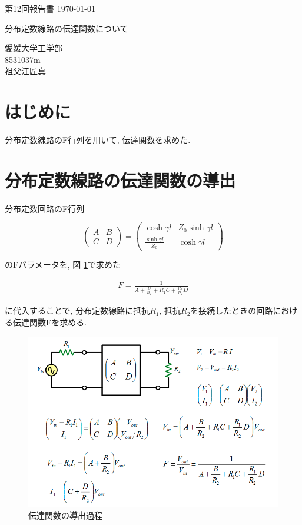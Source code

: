 \documentclass[a4j,12pt,]{jarticle}
\begin{document}
{\noindent\small 第12回報告書 \hfill\today}
\begin{center}
  {\Large 分布定数線路の伝達関数について}
\end{center}
\begin{flushright}
  愛媛大学工学部 \\
  8531037m \\
  祖父江匠真 \\
\end{flushright}

\section{はじめに}

分布定数線路のF行列を用いて, 伝達関数を求めた.

\section{分布定数線路の伝達関数の導出}

分布定数回路のF行列

\[
  \left(
  \begin{array}{cc}
      A & B \\
      C & D
    \end{array}
  \right) =
  \left(
  \begin{array}{cc}
      \cosh\gamma l             & Z_0\sinh\gamma l \\
      \frac{\sinh\gamma l}{Z_0} & \cosh\gamma l
    \end{array}
  \right)
\]

のFパラメータを, 図 \ref{p1}で求めた


\begin{eqnarray}
  F =  \frac{1}{A + \frac{B}{R_2} + R_1C + \frac{R_1}{R_2}D}
\end{eqnarray}

に代入することで, 分布定数線路に抵抗$R_1$, 抵抗$R_2$を接続したときの回路における伝達関数Fを求める.

\begin{figure}[H]
  \begin{center}
    \includegraphics[width=140mm]{p1.png}
    \caption{伝達関数の導出過程}
    \label{p1}
  \end{center}
\end{figure}
\end{document}
